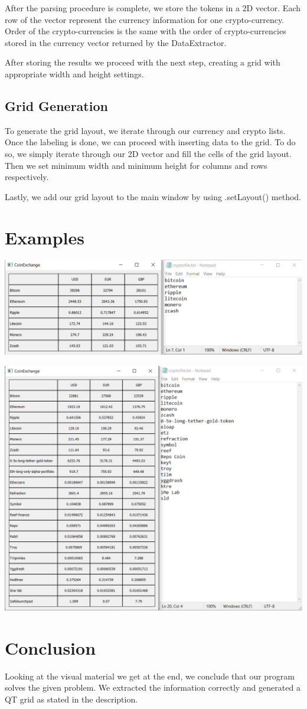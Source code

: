 \documentclass[12pt,a4paper]{article}
\begin{document}
After the parsing procedure is complete, we store the tokens in a 2D vector. Each row of the vector represent the currency information for one crypto-currency. Order of the crypto-currencies is the same with the order of crypto-currencies stored in the currency vector returned by the DataExtractor. \par
After storing the results we proceed with the next step, creating a grid with appropriate width and height settings. \par

\subsection{Grid Generation}

To generate the grid layout, we iterate through our currency and crypto lists. Once the labeling is done, we can proceed with inserting data to the grid. To do so, we simply iterate through our 2D vector and fill the cells of the grid layout. Then we set minimum width and minimum height for columns and rows respectively.  \par
Lastly, we add our grid layout to the main window by using .setLayout() method. \par

\section{Examples}

\includegraphics[width=15cm]{Table1.png} \par
\includegraphics[width=15cm]{Table2.png}

\section{Conclusion}

Looking at the visual material we get at the end, we conclude that our program solves the given problem. We extracted the information correctly and generated a QT grid as stated in the description.
\end{document}
